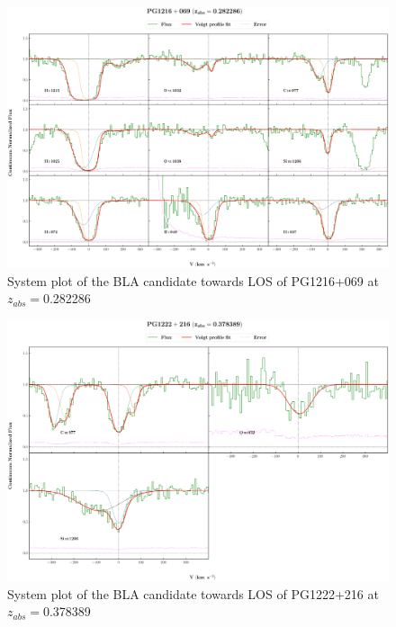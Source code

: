 \begin{landscape}
\begin{figure} 
  \centering  
  \hspace*{-21mm}
    \includegraphics[width=\linewidth]{Figures//system-plots/PG1216+069_z=0.282286_sys_plot.png} 
  \caption{System plot of the BLA candidate towards LOS of PG1216+069 at $z_{abs}=$0.282286} 
\end{figure}



\begin{figure} 
  \centering  
  \hspace*{-21mm}
    \includegraphics[width=\linewidth]{Figures//system-plots/PG1222+216_z=0.378389_sys_plot.png} 
  \caption{System plot of the BLA candidate towards LOS of PG1222+216 at $z_{abs}=$0.378389} 
\end{figure}




\end{landscape}
